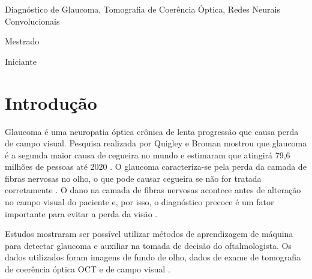 \documentclass[conference]{IEEEtran}
\begin{document}
\renewcommand\IEEEkeywordsname{Palavras-chave}
\begin{IEEEkeywords}
\label{Palavras-chave}
Diagnóstico de Glaucoma, Tomografia de Coerência Óptica, Redes Neurais Convolucionais
\end{IEEEkeywords}

\renewcommand\IEEEkeywordsname{Classifica\c{c}\~{a}o}
\begin{IEEEkeywords}
	\label{classificacao}
	Mestrado
\end{IEEEkeywords}

\renewcommand\IEEEkeywordsname{Categoria}
\begin{IEEEkeywords}
	\label{Categoria}
	Iniciante 
\end{IEEEkeywords}

\IEEEpeerreviewmaketitle


\section{Introdução}



Glaucoma é uma neuropatia óptica crônica de lenta progressão que causa perda de campo visual. Pesquisa realizada por Quigley e Broman mostrou que glaucoma é a segunda maior causa de cegueira no mundo e estimaram que atingirá 79,6 milhões de pessoas até 2020 \cite{Quigley2006}. O glaucoma caracteriza-se pela perda da camada de fibras nervosas no olho, o que pode causar cegueira se não for tratada corretamente \cite{Quigley2011}. O dano na camada de fibras nervosas acontece antes de alteração no campo visual do paciente e, por isso, o diagnóstico precoce é um fator importante para evitar a perda da visão \cite{Malik2012}.

Estudos mostraram ser possível utilizar métodos de aprendizagem de máquina para detectar glaucoma e auxiliar na tomada de decisão do oftalmologista. Os dados utilizados foram imagens de fundo de olho, dados de exame de tomografia de coerência óptica OCT e de campo visual \cite{Gracitelli2015, Asaoka2016, bowd2008, silva2013, kwokleung2002}. 
\end{document}

